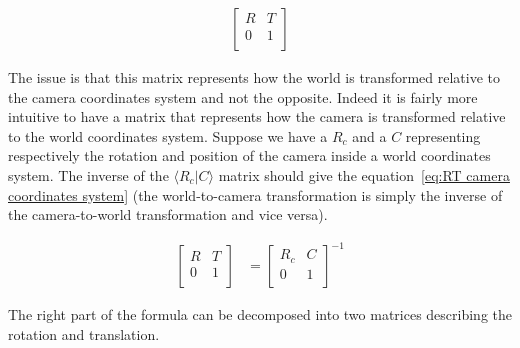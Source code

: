 \begin{align}
\label{eq:RT camera coordinates system}
\left[
\begin{array}{c|c}
R & T \\
\hline 
0 & 1 \\
\end{array}
\right]
 \end{align}

 The issue is that this matrix represents how the world is transformed relative to the camera coordinates system and not the opposite. Indeed it is fairly more intuitive to have a matrix that represents how the camera is transformed relative to the world coordinates system. Suppose we have a $R_c$ and a $C$ representing respectively the rotation and position of the camera inside a world coordinates system. The inverse of the $\langle R_c\vert C\rangle$ matrix should give the equation~\ref{eq:RT camera coordinates system} (the world-to-camera transformation is simply the inverse of the camera-to-world transformation and vice versa). 

\begin{align}
\label{eq:RT camera and RT world}
\left[
\begin{array}{c|c}
R & T \\
\hline 
0 & 1 \\
\end{array}
\right]
&= 
\left[
\begin{array}{c|c}
R_c & C \\
\hline
0 & 1 \\
\end{array}
\right]^{-1} 
 \end{align} 

The right part of the formula can be decomposed into two matrices describing the rotation and translation.

